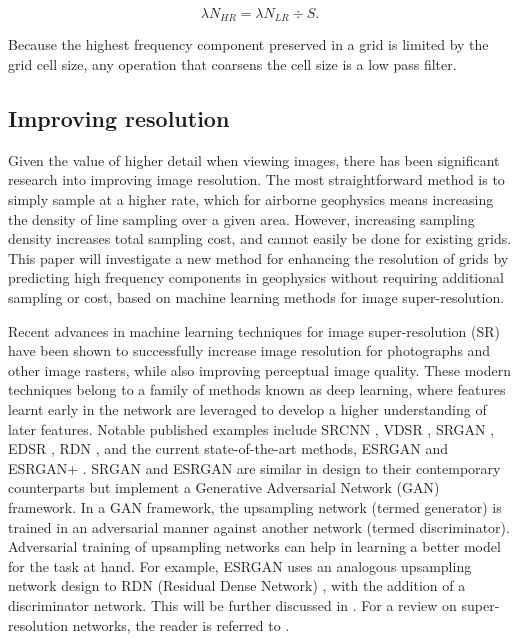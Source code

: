 \documentclass[manuscript.tex]{subfiles}
\begin{document}
\begin{equation}
    \label{eqn:hrn}
    \lambda{}N_{HR} = \lambda{}N_{LR} \div{}S.
\end{equation}

Because the highest frequency component preserved in a grid is limited by the grid cell size, any operation that coarsens the cell size is a low pass filter.

\subsection{Improving resolution}
Given the value of higher detail when viewing images, there has been significant research into improving image resolution.
The most straightforward method is to simply sample at a higher rate, which for airborne geophysics means increasing the density of line sampling over a given area.
However, increasing sampling density increases total sampling cost, and cannot easily be done for existing grids.
This paper will investigate a new method for enhancing the resolution of grids by predicting high frequency components in geophysics without requiring additional sampling or cost, based on machine learning methods for image super-resolution.

Recent advances in machine learning techniques for image super-resolution (SR) have been shown to successfully increase image resolution for photographs and other image rasters, while also improving perceptual image quality.
These modern techniques belong to a family of methods known as deep learning, where features learnt early in the network are leveraged to develop a higher understanding of later features.
Notable published examples include SRCNN \parencite{dongLearningDeepConvolutional2014}, VDSR \parencite{kimAccurateImageSuperresolution2016}, SRGAN \parencite{ledigPhotorealisticSingleImage2017}, EDSR \parencite{limEnhancedDeepResidual2017}, RDN \parencite{zhangResidualDenseNetwork2018}, and the current state-of-the-art methods, ESRGAN \parencite{wangESRGANEnhancedSuperresolution2018} and ESRGAN+ \parencite{rakotonirinaESRGANFurtherImproving2020}.
SRGAN and ESRGAN are similar in design to their contemporary counterparts but implement a Generative Adversarial Network (GAN) framework.
In a GAN framework, the upsampling network (termed generator) is trained in an adversarial manner against another network (termed discriminator).
Adversarial training of upsampling networks can help in learning a better model for the task at hand.
For example, ESRGAN uses an analogous upsampling network design to RDN (Residual Dense Network) , with the addition of a discriminator network.
This will be further discussed in .
For a review on super-resolution networks, the reader is referred to \cite{anwarDeepJourneySuperresolution2020}.
\end{document}
